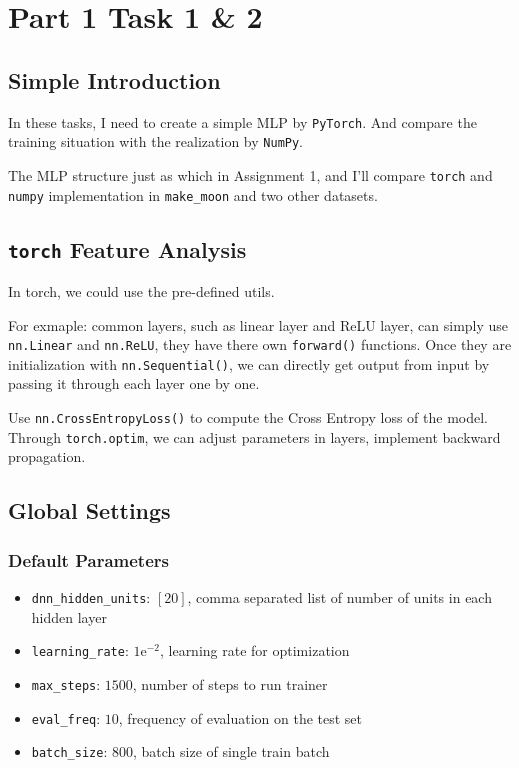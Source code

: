\section{Part 1 Task 1 \& 2}

\subsection{Simple Introduction}

In these tasks, I need to create a simple MLP by \texttt{PyTorch}.
And compare the training situation with the realization by \texttt{NumPy}.

The MLP structure just as which in Assignment 1, and I'll compare \texttt{torch} and \texttt{numpy} implementation in \texttt{make\_moon} and two other datasets.

\subsection{\texttt{torch} Feature Analysis}

In torch, we could use the pre-defined utils.

For exmaple: common layers, such as linear layer and ReLU layer, can simply use \texttt{nn.Linear} and \texttt{nn.ReLU}, they have there own \texttt{forward()} functions.
Once they are initialization with \texttt{nn.Sequential()}, we can directly get output from input by passing it through each layer one by one.

Use \texttt{nn.CrossEntropyLoss()} to compute the Cross Entropy loss of the model.
Through \texttt{torch.optim}, we can adjust parameters in layers, implement backward propagation.

\subsection{Global Settings}

\subsubsection{Default Parameters}

\begin{itemize}
  \item \texttt{dnn\_hidden\_units}: $[20]$, comma separated list of number of units in each hidden layer
  \item \texttt{learning\_rate}: $1\mathrm{e}^{-2}$, learning rate for optimization
  \item \texttt{max\_steps}: $1500$, number of steps to run trainer
  \item \texttt{eval\_freq}: $10$, frequency of evaluation on the test set
  \item \texttt{batch\_size}: $800$, batch size of single train batch
\end{itemize}

